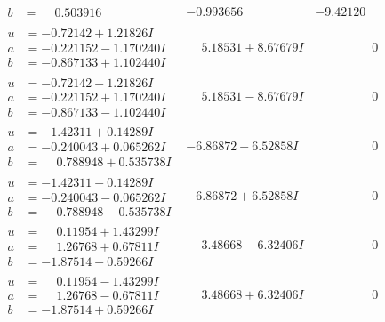 \documentclass[1p]{elsarticle_modified}
\theoremstyle{definition}
\begin{document}
$$\begin{array}{c|c|c}
\begin{aligned}
b &= \phantom{-}0.503916\phantom{ +0.000000I}\end{aligned}
 & -0.993656\phantom{ +0.000000I} & -9.42120\phantom{ +0.000000I} \\ \hline\begin{aligned}
u &= -0.72142 + 1.21826 I \\
a &= -0.221152 - 1.170240 I \\
b &= -0.867133 + 1.102440 I\end{aligned}
 & \phantom{-}5.18531 + 8.67679 I & \phantom{-0.000000 } 0 \\ \hline\begin{aligned}
u &= -0.72142 - 1.21826 I \\
a &= -0.221152 + 1.170240 I \\
b &= -0.867133 - 1.102440 I\end{aligned}
 & \phantom{-}5.18531 - 8.67679 I & \phantom{-0.000000 } 0 \\ \hline\begin{aligned}
u &= -1.42311 + 0.14289 I \\
a &= -0.240043 + 0.065262 I \\
b &= \phantom{-}0.788948 + 0.535738 I\end{aligned}
 & -6.86872 - 6.52858 I & \phantom{-0.000000 } 0 \\ \hline\begin{aligned}
u &= -1.42311 - 0.14289 I \\
a &= -0.240043 - 0.065262 I \\
b &= \phantom{-}0.788948 - 0.535738 I\end{aligned}
 & -6.86872 + 6.52858 I & \phantom{-0.000000 } 0 \\ \hline\begin{aligned}
u &= \phantom{-}0.11954 + 1.43299 I \\
a &= \phantom{-}1.26768 + 0.67811 I \\
b &= -1.87514 - 0.59266 I\end{aligned}
 & \phantom{-}3.48668 - 6.32406 I & \phantom{-0.000000 } 0 \\ \hline\begin{aligned}
u &= \phantom{-}0.11954 - 1.43299 I \\
a &= \phantom{-}1.26768 - 0.67811 I \\
b &= -1.87514 + 0.59266 I\end{aligned}
 & \phantom{-}3.48668 + 6.32406 I & \phantom{-0.000000 } 0 \\ \hline\begin{aligned}

\end{aligned}
\end{array}$$
\end{document}

